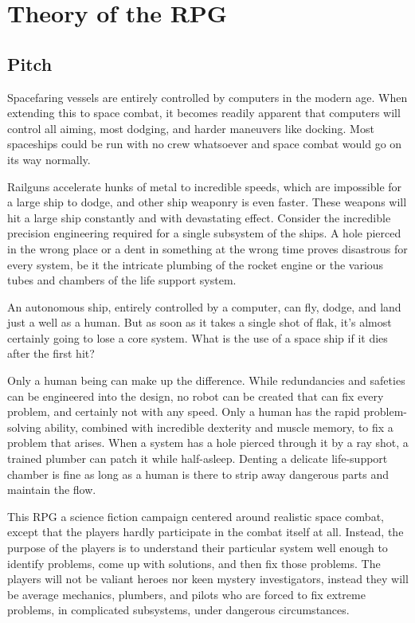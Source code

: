\documentclass[a4paper]{article}
\begin{document}
\section{Theory of the RPG} \label{theory}

\subsection{Pitch}

Spacefaring vessels are entirely controlled by computers in the modern age. When extending this to space combat, it becomes readily apparent that computers will control all aiming, most dodging, and harder maneuvers like docking. Most spaceships could be run with no crew whatsoever and space combat would go on its way normally.

Railguns accelerate hunks of metal to incredible speeds, which are impossible for a large ship to dodge, and other ship weaponry is even faster. These weapons will hit a large ship constantly and with devastating effect. Consider the incredible precision engineering required for a single subsystem of the ships. A hole pierced in the wrong place or a dent in something at the wrong time proves disastrous for every system, be it the intricate plumbing of the rocket engine or the various tubes and chambers of the life support system.

An autonomous ship, entirely controlled by a computer, can fly, dodge, and land just a well as a human. But as soon as it takes a single shot of flak, it's almost certainly going to lose a core system. What is the use of a space ship if it dies after the first hit?

Only a human being can make up the difference. While redundancies and safeties can be engineered into the design, no robot can be created that can fix every problem, and certainly not with any speed. Only a human has the rapid problem-solving ability, combined with incredible dexterity and muscle memory, to fix a problem that arises. When a system has a hole pierced through it by a ray shot, a trained plumber can patch it while half-asleep. Denting a delicate life-support chamber is fine as long as a human is there to strip away dangerous parts and maintain the flow.

This RPG a science fiction campaign centered around realistic space combat, except that the players hardly participate in the combat itself at all. Instead, the purpose of the players is to understand their particular system well enough to identify problems, come up with solutions, and then fix those problems. The players will not be valiant heroes nor keen mystery investigators, instead they will be average mechanics, plumbers, and pilots who are forced to fix extreme problems, in complicated subsystems, under dangerous circumstances. 
\end{document}
